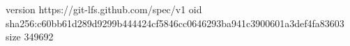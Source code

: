 version https://git-lfs.github.com/spec/v1
oid sha256:c60bb61d289d9299b444424cf5846cc0646293ba941c3900601a3def4fa83603
size 349692

